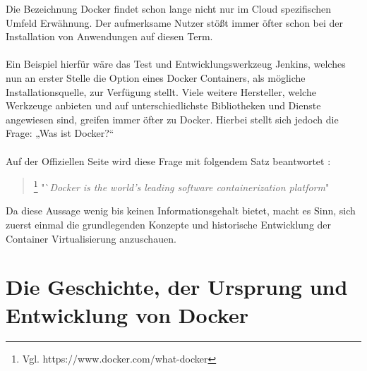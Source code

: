 \documentclass[12pt,toc=bib,toc=listof]{scrreprt}
\begin{document}
Die Bezeichnung Docker findet schon lange nicht nur im Cloud spezifischen Umfeld Erwähnung.
Der aufmerksame Nutzer stößt immer öfter schon bei der Installation von Anwendungen auf diesen Term.\\
\\
Ein Beispiel hierfür wäre das Test und Entwicklungswerkzeug Jenkins, welches nun an erster Stelle die Option eines Docker Containers, als mögliche Installationsquelle, zur Verfügung stellt. \cite{jenkins}
Viele weitere Hersteller, welche Werkzeuge anbieten und auf unterschiedlichste Bibliotheken und Dienste angewiesen sind, greifen immer öfter zu Docker. 
Hierbei stellt sich jedoch die Frage: „Was ist Docker?“ \\
\\
Auf der Offiziellen Seite wird diese Frage mit folgendem Satz beantwortet :

\begin{quote}
	\footnote[1]{Vgl. https://www.docker.com/what-docker}
	"`\textit{Docker is the world's leading software containerization platform}"
\end{quote}
Da diese Aussage wenig bis keinen Informationsgehalt bietet, macht es Sinn, sich zuerst einmal die grundlegenden Konzepte und historische Entwicklung der Container Virtualisierung anzuschauen. 

\section{Die Geschichte, der Ursprung und Entwicklung von Docker}
\end{document}
